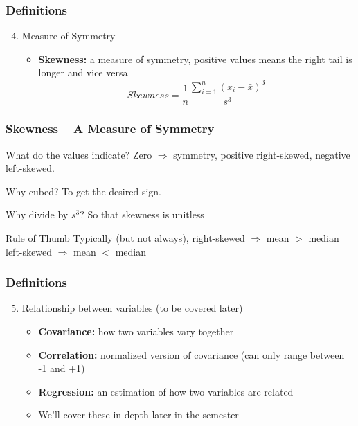 \documentclass{beamer}
\begin{document}
\begin{frame}
\frametitle{Definitions}
	\begin{enumerate}
	\setcounter{enumi}{3}
		\item Measure of Symmetry
		\begin{itemize}
			\item \textbf{Skewness:} a measure of symmetry, positive values means the right tail is 				longer and vice versa
			$$
			Skewness = \frac{1}{n}\frac{\sum_{i = 1}^n (x_i - \bar{x})^3}{s^3}
			$$
		\end{itemize}
	\end{enumerate}
\end{frame}

 \begin{frame}
 \frametitle{Skewness -- A Measure of Symmetry}
	 \begin{center}
	 \end{center}
	 \begin{block}{What do the values indicate?}
	 	Zero $\Rightarrow$ symmetry, positive right-skewed, negative left-skewed.
	 \end{block}
	 \begin{block}{Why cubed?}
	 	To get the desired sign.
	 \end{block}
	 \begin{block}{Why divide by $s^3$?}
	 	So that skewness is unitless
	 \end{block}
	 \begin{block}{Rule of Thumb}
	 	Typically (but not always), right-skewed $\Rightarrow$ mean $>$ median
	 	\\ 
	 	left-skewed $\Rightarrow$ mean $<$ median
	 \end{block}
 \end{frame}

\begin{frame}
\frametitle{Definitions}
	\begin{enumerate}
	\setcounter{enumi}{4}
		\item Relationship between variables (to be covered later)
		\begin{itemize}
			\item \textbf{Covariance:} how two variables vary together
			\item \textbf{Correlation:} normalized version of covariance (can only range between -1 			and +1)
			\item \textbf{Regression:} an estimation of how two variables are related
			\item \alert{We'll cover these in-depth later in the semester}
		\end{itemize}
	\end{enumerate}
\end{frame}
\end{document}
